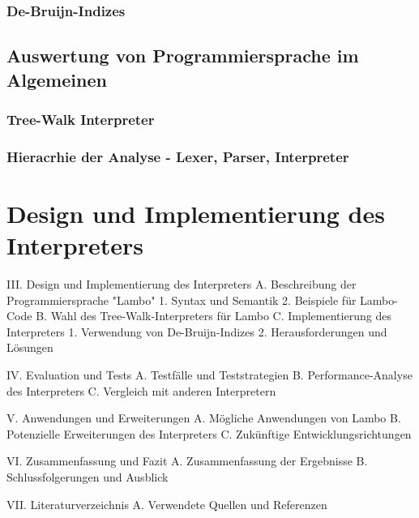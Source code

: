 \documentclass{article}
\begin{document}
\subsubsection{De-Bruijn-Indizes}

\subsection{Auswertung von Programmiersprache im Algemeinen}

\subsubsection{Tree-Walk Interpreter}

\subsubsection{Hieracrhie der Analyse - Lexer, Parser, Interpreter}


\section{Design und Implementierung des Interpreters}

III. Design und Implementierung des Interpreters
A. Beschreibung der Programmiersprache "Lambo"
1. Syntax und Semantik
2. Beispiele für Lambo-Code
B. Wahl des Tree-Walk-Interpreters für Lambo
C. Implementierung des Interpreters
1. Verwendung von De-Bruijn-Indizes
2. Herausforderungen und Lösungen

IV. Evaluation und Tests
A. Testfälle und Teststrategien
B. Performance-Analyse des Interpreters
C. Vergleich mit anderen Interpretern

V. Anwendungen und Erweiterungen
A. Mögliche Anwendungen von Lambo
B. Potenzielle Erweiterungen des Interpreters
C. Zukünftige Entwicklungsrichtungen

VI. Zusammenfassung und Fazit
A. Zusammenfassung der Ergebnisse
B. Schlussfolgerungen und Ausblick

VII. Literaturverzeichnis
A. Verwendete Quellen und Referenzen




\end{document}
